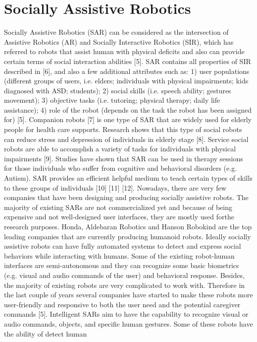\section{Socially Assistive Robotics}
Socially Assistive Robotics (SAR) can be considered as the intersection of Assistive
Robotics (AR) and Socially Interactive Robotics (SIR), which has referred to robots that
assist human with physical deficits and also can provide certain terms of social interaction
abilities [5]. SAR contains all properties of SIR described in [6], and also a few additional
attributes such as: 1) user populations (different groups of users, i.e. elders; individuals
with physical impairments; kids diagnosed with ASD; students); 2) social skills (i.e. speech
ability; gestures movement); 3) objective tasks (i.e. tutoring; physical therapy; daily life
assistance); 4) role of the robot (depends on the task the robot has been assigned for) [5].
Companion robots [7] is one type of SAR that are widely used for elderly people
for health care supports. Research shows that this type of social robots can reduce stress
and depression of individuals in elderly stage [8]. Service social robots are able to
accomplish a variety of tasks for individuals with physical impairments [9]. Studies have
shown that SAR can be used in therapy sessions for those individuals who suffer from
cognitive and behavioral disorders (e.g. Autism). SAR provides an efficient helpful
medium to teach certain types of skills to these groups of individuals [10] [11] [12].
Nowadays, there are very few companies that have been designing and producing
socially assistive robots. The majority of existing SARs are not commercialized yet and
because of being expensive and not well-designed user interfaces, they are mostly used forthe research purposes. Honda, Aldebaran Robotics and Hanson Robokind are the top
leading companies that are currently producing humanoid robots.
Ideally socially assistive robots can have fully automated systems to detect and
express social behaviors while interacting with humans. Some of the existing robot-human
interfaces are semi-autonomous and they can recognize some basic biometrics (e.g. visual
and audio commands of the user) and behavioral response. Besides, the majority of existing
robots are very complicated to work with. Therefore in the last couple of years several
companies have started to make these robots more user-friendly and responsive to both the
user need and the potential caregiver commands [5].
Intelligent SARs aim to have the capability to recognize visual or audio commands,
objects, and specific human gestures. Some of these robots have the ability of detect human
